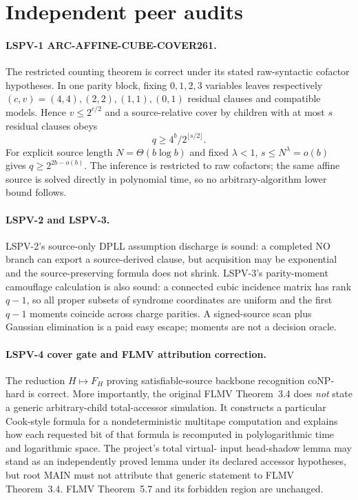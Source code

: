 \documentclass[11pt]{article}
\begin{document}
\section{Independent peer audits}
\paragraph{LSPV-1 ARC-AFFINE-CUBE-COVER261.}
The restricted counting theorem is correct under its stated raw-syntactic
cofactor hypotheses.  In one parity block, fixing $0,1,2,3$ variables leaves
respectively $(c,v)=(4,4),(2,2),(1,1),(0,1)$ residual clauses and compatible
models.  Hence $v\le2^{c/2}$ and a source-relative cover by children with at
most $s$ residual clauses obeys
\[
 q\ge4^b/2^{\lfloor s/2\rfloor}.
\]
For explicit source length $N=\Theta(b\log b)$ and fixed $\lambda<1$,
$s\le N^\lambda=o(b)$ gives $q\ge2^{2b-o(b)}$.  The inference is restricted
to raw cofactors; the same affine source is solved directly in polynomial time,
so no arbitrary-algorithm lower bound follows.

\paragraph{LSPV-2 and LSPV-3.}
LSPV-2's source-only DPLL assumption discharge is sound: a completed NO branch
can export a source-derived clause, but acquisition may be exponential and the
source-preserving formula does not shrink.  LSPV-3's parity-moment camouflage
calculation is also sound: a connected cubic incidence matrix has rank $q-1$,
so all proper subsets of syndrome coordinates are uniform and the first
$q-1$ moments coincide across charge parities.  A signed-source scan plus
Gaussian elimination is a paid easy escape; moments are not a decision oracle.

\paragraph{LSPV-4 cover gate and FLMV attribution correction.}
The reduction $H\mapsto F_H$ proving satisfiable-source backbone recognition
coNP-hard is correct.  More importantly, the original FLMV Theorem~3.4 does
\emph{not} state a generic arbitrary-child total-accessor simulation.  It
constructs a particular Cook-style formula for a nondeterministic multitape
computation and explains how each requested bit of that formula is recomputed
in polylogarithmic time and logarithmic space.  The project's total virtual-
input head-shadow lemma may stand as an independently proved lemma under its
declared accessor hypotheses, but root MAIN must not attribute that generic
statement to FLMV Theorem~3.4.  FLMV Theorem~5.7 and its forbidden region are
unchanged.
\end{document}
